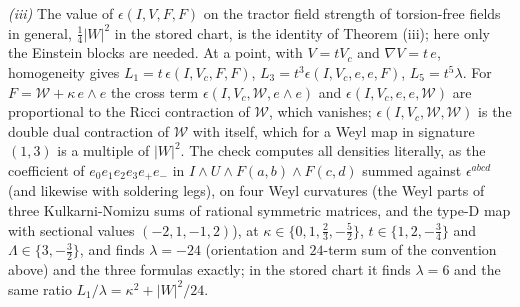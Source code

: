 \emph{(iii)} The value of $\epsilon(I, V, F, F)$ on the tractor field strength of torsion-free fields in general, $\tfrac14|W|^{2}$ in the stored chart, is the identity of Theorem (iii); here only the Einstein blocks are needed. At a point, with $V = tV_{c}$ and $\nabla V = t\,e$, homogeneity gives $L_{1} = t\,\epsilon(I, V_{c}, F, F)$, $L_{3} = t^{3}\epsilon(I, V_{c}, e, e, F)$, $L_{5} = t^{5}\lambda$. For $F = \mathcal{W} + \kappa\,e\wedge e$ the cross term $\epsilon(I, V_{c}, \mathcal{W}, e\wedge e)$ and $\epsilon(I, V_{c}, e, e, \mathcal{W})$ are proportional to the Ricci contraction of $\mathcal{W}$, which vanishes; $\epsilon(I, V_{c}, \mathcal{W}, \mathcal{W})$ is the double dual contraction of $\mathcal{W}$ with itself, which for a Weyl map in signature $(1,3)$ is a multiple of $|W|^{2}$. The check computes all densities literally, as the coefficient of $e_{0}e_{1}e_{2}e_{3}e_{+}e_{-}$ in $I\wedge U\wedge F(a,b)\wedge F(c,d)$ summed against $\epsilon^{abcd}$ (and likewise with soldering legs), on four Weyl curvatures (the Weyl parts of three Kulkarni-Nomizu sums of rational symmetric matrices, and the type-D map with sectional values $(-2, 1, -1, 2)$), at $\kappa \in \{0, 1, \tfrac23, -\tfrac52\}$, $t \in \{1, 2, -\tfrac34\}$ and $\Lambda \in \{3, -\tfrac32\}$, and finds $\lambda = -24$ (orientation and $24$-term sum of the convention above) and the three formulas exactly; in the stored chart it finds $\lambda = 6$ and the same ratio $L_{1}/\lambda = \kappa^{2} + |W|^{2}/24$.

